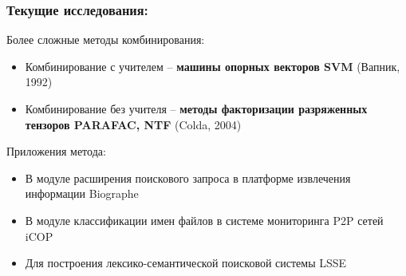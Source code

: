 \documentclass{beamer}
\begin{document}
\begin{frame}
\frametitle{Текущие исследования:}

\begin{block}{Более сложные методы комбинирования:}	
\begin{itemize}
	\item Комбинирование с учителем -- \textbf{машины опорных векторов SVM} (Вапник, 1992)
	\item Комбинирование без учителя -- \textbf{методы факторизации разряженных тензоров PARAFAC, NTF} (Colda, 2004)   
\end{itemize}
\end{block}

\begin{block}{Приложения метода:}	
\begin{itemize} 
			\item В модуле расширения поискового запроса в платформе извлечения информации Biographe
			\item В модуле классификации имен файлов в системе мониторинга P2P сетей iCOP
			\item Для построения лексико-семантической поисковой системы LSSE
\end{itemize}
\end{block}


\end{frame}
\end{document}
